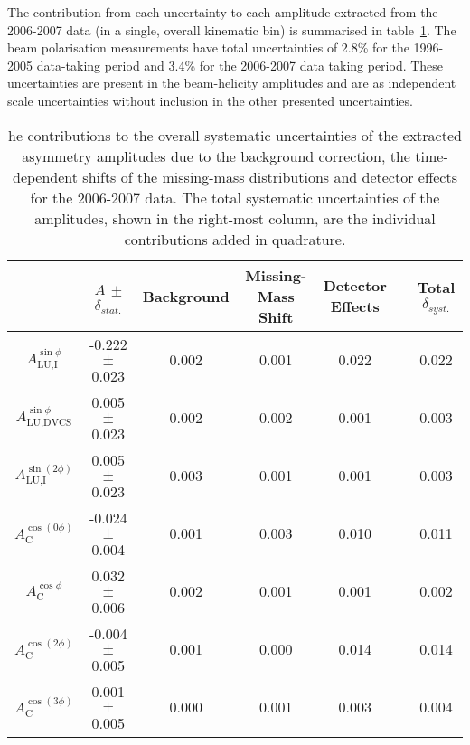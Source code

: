 The contribution from each uncertainty to each amplitude extracted from the 2006-2007 data (in a single, overall kinematic bin) is summarised in table~\ref{table_systematic_contributions_0607}. The beam polarisation measurements have total uncertainties of 2.8\% for the 1996-2005 data-taking period and 3.4\% for the 2006-2007 data taking period. These uncertainties are present in the beam-helicity amplitudes and are as independent scale uncertainties without inclusion in the other presented uncertainties.
\begin{table}
 \begin{center}
\resizebox{\textwidth}{!} {
 \begin{tabular}{|c|c||c|c|c|c|c|}
  \hline
 & $A$ $\pm$ $\delta_{stat.}$& Background & Missing-Mass Shift  & Detector Effects & & Total $\delta_{syst.}$ \\
  \hline
  \hline
  $A_{\textrm{LU,I}}^{\sin\phi}$ & -0.222  $\pm$  0.023  & 0.002 & 0.001 & 0.022 & & 0.022 \\
  \hline
  $A_{\textrm{LU,DVCS}}^{\sin\phi}$ & 0.005  $\pm$  0.023  & 0.002 & 0.002 & 0.001 & & 0.003 \\
  \hline
  $A_{\textrm{LU,I}}^{\sin(2\phi)}$ & 0.005  $\pm$  0.023  & 0.003 & 0.001 & 0.001 & & 0.003 \\
  \hline
  \hline
  $A_{\textrm{C}}^{\cos(0\phi)}$ & -0.024 $\pm$  0.004 & 0.001 & 0.003 & 0.010 & & 0.011 \\
  \hline
  $A_{\textrm{C}}^{\cos\phi}$ & 0.032  $\pm$  0.006 & 0.002 & 0.001 & 0.001 & & 0.002 \\
  \hline
  $A_{\textrm{C}}^{\cos(2\phi)}$ & -0.004  $\pm$  0.005 & 0.001 & 0.000 & 0.014 & & 0.014 \\
  \hline
  $A_{\textrm{C}}^{\cos(3\phi)}$ & 0.001  $\pm$   0.005 & 0.000 & 0.001 & 0.003 & & 0.004 \\
  \hline
 \end{tabular}
}
  \caption{he contributions to the overall systematic uncertainties of the extracted asymmetry amplitudes due to the background correction, the time-dependent shifts of the missing-mass distributions and detector effects for the 2006-2007 data. The total
systematic uncertainties of the amplitudes, shown in the right-most column, are the individual contributions added in quadrature.}
  \label{table_systematic_contributions_0607}
\end{center}
\end{table}
